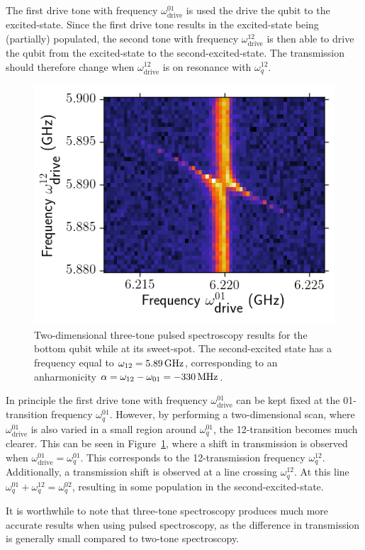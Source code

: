         The first drive tone with frequency $\omega_\text{drive}^{01}$ is used the drive the qubit to the excited-state. Since the first drive tone results in the excited-state being (partially) populated, the second tone with frequency $\omega_\text{drive}^{12}$ is then able to drive the qubit from the excited-state to the second-excited-state. The transmission should therefore change when $\omega_\text{drive}^{12}$ is on resonance with $\omega_q^{12}$.

        \begin{figure}[tb]
          \centering
          \includegraphics[width=.6\textwidth]{../Figures/Qubit characterization/second transition spec.png}
          \caption{Two-dimensional three-tone pulsed spectroscopy results for the bottom qubit while at its sweet-spot. The second-excited state has a frequency equal to $\omega_{12}=\text{\ensuremath{\SI{5.89}{\giga \hertz}}}$, corresponding to an anharmonicity $\alpha= \omega_{12}-\omega_{01}=\text{\ensuremath{\SI{-330}{\mega \hertz}}}$.}
          \label{fig:Second excited state spectroscopy}
        \end{figure}

        In principle the first drive tone with frequency $\omega_\text{drive}^{01}$ can be kept fixed at the 01-transition frequency $\omega_q^{01}$. However, by performing a two-dimensional scan, where $\omega_\text{drive}^{01}$ is also varied in a small region around $\omega_q^{01}$, the 12-transition becomes much clearer. This can be seen in Figure~\ref{fig:Second excited state spectroscopy}, where a shift in transmission is observed when $\omega_\text{drive}^{01} = \omega_q^{01}$. This corresponds to the 12-transmission frequency $\omega_q^{12}$. Additionally, a transmission shift is observed at a line crossing $\omega_q^{12}$. At this line $\omega_q^{01} + \omega_q^{12} = \omega_q^{02}$, resulting in some population in the second-excited-state.


        It is worthwhile to note that three-tone spectroscopy produces much more accurate results when using pulsed spectroscopy, as the difference in transmission is generally small compared to two-tone spectroscopy.

